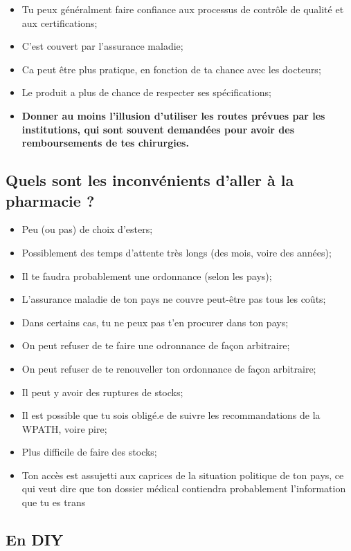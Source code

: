 \documentclass{article}
\begin{document}
\begin{itemize}
  \item Tu peux généralment faire confiance aux processus de contrôle de qualité et aux certifications;
  \item C'est couvert par l'assurance maladie;
  \item Ca peut être plus pratique, en fonction de ta chance avec les docteurs;
  \item Le produit a plus de chance de respecter ses spécifications;
  \item \textbf{Donner au moins l'illusion d'utiliser les routes prévues par les institutions, qui sont souvent demandées pour avoir des remboursements de tes chirurgies.}
\end{itemize}

\subsection{Quels sont les inconvénients d'aller à la pharmacie ?}

\begin{itemize}
  \item Peu (ou pas) de choix d'esters;
  \item Possiblement des temps d'attente très longs (des mois, voire des années);
  \item Il te faudra probablement une ordonnance (selon les pays);
  \item L'assurance maladie de ton pays ne couvre peut-être pas tous les coûts;
  \item Dans certains cas, tu ne peux pas t'en procurer dans ton pays;
  \item On peut refuser de te faire une odronnance de façon arbitraire;
  \item On peut refuser de te renouveller ton ordonnance de façon arbitraire;
  \item Il peut y avoir des ruptures de stocks;
  \item Il est possible que tu sois obligé.e de suivre les recommandations de la WPATH, voire pire;
  \item Plus difficile de faire des stocks;
  \item Ton accès est assujetti aux caprices de la situation politique de ton pays, ce qui veut dire que ton dossier médical contiendra probablement l'information que tu es trans
\end{itemize}

\subsection*{En DIY}
\end{document}
